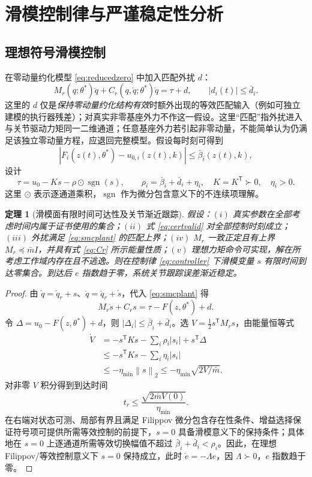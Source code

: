 \documentclass[journal,onecolumn]{IEEEtran}
\newtheorem{theorem}{定理}[section]
\newcommand{\norm}[1]{\left\lVert#1\right\rVert}
\newcommand{\abs}[1]{\left\lvert#1\right\rvert}
\newcommand{\tr}{\mathsf T}
\begin{document}
\section{滑模控制律与严谨稳定性分析}
\subsection{理想符号滑模控制}
在零动量约化模型 \eqref{eq:reducedzero} 中加入匹配外扰 $d$：
\begin{equation}
 M_r(q;\theta^\ast)\ddot q+C_r(q,\dot q;\theta^\ast)\dot q=\tau+d,
 \qquad\abs{d_i(t)}\le\bar d_i.
 \label{eq:smcplant}
\end{equation}
这里的 $d$ 仅是\emph{保持零动量约化结构有效}时额外出现的等效匹配输入（例如可独立建模的执行器残差）；对真实非零基座外力不作这一假设。这里“匹配”指外扰进入与关节驱动力矩同一二维通道；任意基座外力若引起非零动量，不能简单认为仍满足该独立零动量方程，应退回完整模型。假设每时刻可得到
\begin{equation}
 \abs{F_i(z(t),\theta^\ast)-u_{0,i}(z(t),k)}\le\bar\beta_i(z(t),k),
 \label{eq:certvalid}
\end{equation}
设计
\begin{equation}
 \boxed{\tau=u_0-Ks-\rho\odot\operatorname{sgn}(s),\qquad
 \rho_i=\bar\beta_i+\bar d_i+\eta_i,\quad K=K^\tr\succ0,\quad\eta_i>0.}
 \label{eq:controller}
\end{equation}
这里 $\odot$ 表示逐通道乘积，$\operatorname{sgn}$ 作为微分包含意义下的不连续项理解。
\begin{theorem}[滑模面有限时间可达性及关节渐近跟踪]
假设：$(i)$ 真实参数在全部考虑时间内属于证书使用的集合；$(ii)$ 式 \eqref{eq:certvalid} 对全部控制时刻成立；$(iii)$ 外扰满足 \eqref{eq:smcplant} 的匹配上界；$(iv)$ $M_r$ 一致正定且有上界 $M_r\preceq\bar m I$，并具有式 \eqref{eq:Cr} 所示能量性质；$(v)$ 理想力矩命令可实现，解在所考虑工作域内存在且不逃逸。则在控制律 \eqref{eq:controller} 下滑模变量 $s$ 有限时间到达零集合。到达后 $e$ 指数趋于零，系统关节跟踪误差渐近稳定。
\end{theorem}
\begin{proof}
由 $\dot q=\dot q_r+s$、$\ddot q=\ddot q_r+\dot s$，代入 \eqref{eq:smcplant} 得
\begin{equation}
 M_r\dot s+C_rs=\tau-F(z,\theta^\ast)+d.
\end{equation}
令 $\Delta=u_0-F(z,\theta^\ast)+d$，则 $|\Delta_i|\le\bar\beta_i+\bar d_i$。选 $V=\tfrac12s^\tr M_rs$，由能量恒等式
\begin{align}
 \dot V&=-s^\tr Ks-\sum_i\rho_i|s_i|+s^\tr\Delta\\
 &\le-s^\tr Ks-\sum_i\eta_i|s_i|\\
 &\le-\eta_{\min}\norm{s}_2\le-\eta_{\min}\sqrt{2V/\bar m}.
\end{align}
对非零 $V$ 积分得到到达时间
\begin{equation}
 \boxed{t_r\le\frac{\sqrt{2\bar m V(0)}}{\eta_{\min}}.}
\end{equation}
在右端对状态可测、局部有界且满足 Filippov 微分包含存在性条件、增益选择保证符号项可提供所需等效控制的前提下，$s=0$ 具备滑模意义下的保持条件；具体地在 $s=0$ 上逐通道所需等效切换幅值不超过 $\bar\beta_i+\bar d_i<\rho_i$。因此，在理想 Filippov/等效控制意义下 $s=0$ 保持成立，此时 $\dot e=-\Lambda e$，因 $\Lambda\succ0$，$e$ 指数趋于零。
\end{proof}
\end{document}
